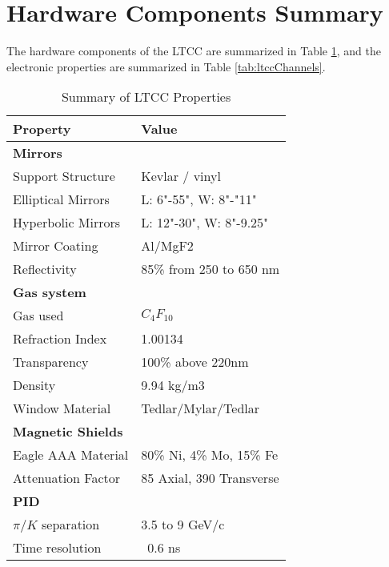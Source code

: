 \section{Hardware Components Summary}


The hardware components of the LTCC are summarized in Table \ref{tab:ltccProperties}, and the electronic properties
are summarized in Table \ref{tab:ltccChannels}.

\begin{table}
	\begin{center}
		\begin{tabular}{| l | l |}
			\hline \hline
			Property                 & Value \\
			\hline
			{\bf Mirrors}            &                               \\
			Support Structure        & Kevlar / vinyl                \\
			Elliptical Mirrors       & L: 6"-55", W: 8"-"11"         \\
			Hyperbolic Mirrors       & L: 12"-30", W: 8"-9.25"       \\
			Mirror Coating           & Al/MgF2                       \\
			Reflectivity             & 85\% from 250 to 650 nm       \\
			{\bf Gas system}         &                               \\
			Gas used                 &   $C_4F_{10}$                 \\
			Refraction Index         & 1.00134                       \\
			Transparency             & 100\% above 220nm             \\
			Density                  & 9.94 kg/m3                    \\
			Window Material          & Tedlar/Mylar/Tedlar           \\
			{\bf Magnetic Shields}   &                               \\
			Eagle AAA Material       & 80\% Ni, 4\% Mo, 15\% Fe      \\
			Attenuation Factor       &  85 Axial, 390 Transverse     \\
			{\bf PID}                &                               \\
			$\pi/K$ separation       &  3.5 to 9 GeV/c               \\
			Time resolution          &  ~0.6 ns                      \\
			\hline \hline
		\end{tabular}
	\end{center}
\caption{Summary of LTCC Properties}\label{tab:ltccProperties}
\end{table}

